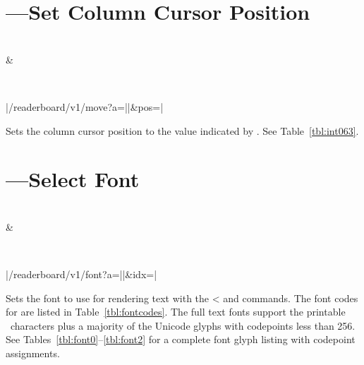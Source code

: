 
\section{---Set Column Cursor Position}
\begin{center}
\begin{bytefield}[endianness=little,bitwidth=0.11111\textwidth]{2}
	 \\
	 &
\end{bytefield}
\\
\begin{Coding}
	|/readerboard/v1/move?a=||&pos=|
\end{Coding}
\end{center}

Sets the column cursor position to the value indicated by . See Table~\ref{tbl:int063}. 

\section{---Select Font}
\begin{center}
\begin{bytefield}[endianness=little,bitwidth=0.11111\textwidth]{2}
	 \\
	 &
\end{bytefield}
\\
\begin{Coding}
	|/readerboard/v1/font?a=||&idx=|
\end{Coding}
\end{center}

Sets the font to use for rendering text with the \z< and  commands.
The font codes for  are listed in Table~\ref{tbl:fontcodes}.
The full text fonts support the printable \ascii\ characters plus a majority
of the Unicode glyphs with codepoints less than 256.  See Tables~\ref{tbl:font0}--\ref{tbl:font2}
for a complete font glyph listing with codepoint assignments.

